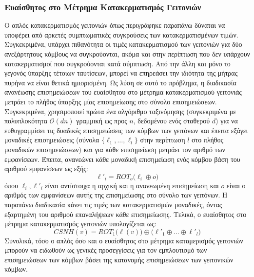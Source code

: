 \subsubsection{Ευαίσθητος στο Μέτρημα Κατακερματισμός Γειτονιών}
Ο απλός κατακερματισμός γειτονιών όπως περιγράφηκε παραπάνω δύναται να υποφέρει από αρκετές συμπτωματικές συγκρούσεις των κατακερματισμένων τιμών.
Συγκεκριμένα, υπάρχει πιθανότητα οι τιμές κατακερματισμού των γειτονιών για δύο ανεξάρτητους κόμβους να συγκρούονται, ακόμα και στην περίπτωση που δεν υπάρχουν κατακερματισμοί που συγκρούονται κατά σύμπτωση.
Από την άλλη και μόνο το γεγονός ύπαρξης τέτοιων ταυτίσεων, μπορεί να επηρεάσει την ιδιότητα της μήτρας πυρήνα να είναι θετικά ημιορισμένη.
Ως λύση σε αυτό το πρόβλημα, η διαδικασία ανανέωσης επισημειώσεων του ευαίσθητου στο μέτρημα κατακερματισμού γειτονιάς μετράει το πλήθος ύπαρξης μίας επισημείωσης στο σύνολο επισημειώσεων.
Συγκεκριμένα, χρησιμοποιεί πρώτα ένα αλγόριθμο ταξινόμησης (συγκεκριμένα  με πολυπλοκότητα $\mathcal{O}(d n)$ γραμμική ως προς $n$, δεδομένου ενός σταθερού $d$) για να ευθυγραμμίσει τις δυαδικές επισημειώσεις των κόμβων των γειτόνων και έπειτα εξάγει μοναδικές επισημειώσεις (σύνολα $\{ \ell_1, \ldots, \ell_l \}$ στην περίπτωση $l$ στο πλήθος μοναδικών επισημειώσεων) και για κάθε επισημείωση μετράει τον αριθμό των εμφανίσεων.
Έπειτα, ανανεώνει κάθε μοναδική επισημείωση ενός κόμβου βάση του αριθμού εμφανίσεων ως εξής:
\begin{equation}
    \ell'_i = ROT_o \big( \ell_i \oplus o \big)
\end{equation}
όπου $\ell_i, \ell'_i$ είναι αντίστοιχα η αρχική και η ανανεωμένη επισημείωση και $o$ είναι ο αριθμός των εμφανίσεων αυτής της επισημείωσης στο σύνολο των γειτόνων.
Η παραπάνω διαδικασία κάνει τις τιμές των κατακερματισμών μοναδικές, όντας εξαρτημένη του αριθμού επαναλήψεων κάθε επισημείωσης.
Τελικά, ο ευαίσθητος στο μέτρημα κατακερματισμός γειτονιών υπολογίζεται ως:
\begin{equation}
    CSNH(v) = ROT_1 \big( \ell(v) \big) \oplus \big( \ell'_1 \oplus \ldots \oplus \ell'_l \big)
\end{equation}
Συνολικά, τόσο ο απλός όσο και ο ευαίσθητος στο μέτρημα καταμερισμός γειτονιών μπορούν να ειδωθούν ως γενικές προσεγγίσεις για τον εμπλουτισμό των επισημειώσεων των κόμβων βάσει της κατανομής επισημειώσεων των γειτονικών κόμβων.

